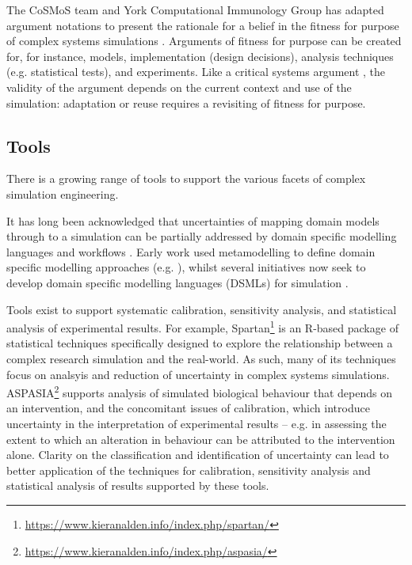 \documentclass[sigconf,authordraft]{acmart}
\begin{document}
The CoSMoS team and York Computational Immunology Group has adapted argument notations to present the rationale for a belief in the fitness for purpose of complex systems simulations \cite{andrews2008simulating,AldenArg,Alden20141059}.  Arguments of fitness for purpose can be created for, for instance, models, implementation (design decisions), analysis techniques (e.g. statistical tests), and experiments.  Like a critical systems argument \cite{LevesonReuse}, the validity of the argument depends on the current context and use of the simulation: adaptation or reuse requires a revisiting of fitness for purpose.

\subsection{Tools}

There is a growing range of tools to support the various facets of complex simulation engineering.

It has long been acknowledged that uncertainties of mapping domain models through to a simulation can be partially addressed by domain specific modelling languages and workflows \cite{polackCEC,cosmosBook}.  Early work used metamodelling to define domain specific modelling approaches (e.g. \cite{polackMOTPW}), whilst several initiatives now seek to develop  domain specific modelling languages (DSMLs) for simulation \cite{workshop}.

Tools exist to support systematic calibration, sensitivity analysis, and statistical analysis of experimental results.  For example, Spartan\footnote{\url{https://www.kieranalden.info/index.php/spartan/}} \cite{spartan,spartan-sim} is an R-based package of statistical techniques specifically designed to explore the relationship between a complex research simulation and the real-world.  As such, many of its techniques focus on analsyis and reduction of uncertainty in complex systems simulations.  ASPASIA\footnote{\url{https://www.kieranalden.info/index.php/aspasia/}} \cite{aspasia} supports analysis of simulated biological behaviour that depends on an intervention, and the concomitant issues of calibration, which introduce uncertainty in the interpretation of experimental results -- e.g. in assessing the extent to which an alteration in behaviour can be attributed to the intervention alone.  Clarity on the classification and identification of uncertainty can lead to better application of the techniques for calibration, sensitivity analysis and statistical analysis of results supported by these tools.
\end{document}
